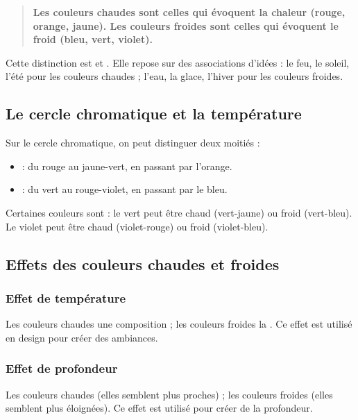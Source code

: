 \begin{quote}
\textbf{Les couleurs chaudes sont celles qui évoquent la chaleur (rouge, orange, jaune). Les couleurs froides sont celles qui évoquent le froid (bleu, vert, violet).}
\end{quote}

Cette distinction est  et . Elle repose sur des associations d'idées : le feu, le soleil, l'été pour les couleurs chaudes ; l'eau, la glace, l'hiver pour les couleurs froides.

\subsection{Le cercle chromatique et la température}

Sur le cercle chromatique, on peut distinguer deux moitiés :

\begin{itemize}
    \item {} : du rouge au jaune-vert, en passant par l'orange.
    \item {} : du vert au rouge-violet, en passant par le bleu.
\end{itemize}

Certaines couleurs sont  : le vert peut être chaud (vert-jaune) ou froid (vert-bleu). Le violet peut être chaud (violet-rouge) ou froid (violet-bleu).

\subsection{Effets des couleurs chaudes et froides}

\subsubsection{Effet de température}

Les couleurs chaudes  une composition ; les couleurs froides la . Ce effet est utilisé en design pour créer des ambiances.

\subsubsection{Effet de profondeur}

Les couleurs chaudes  (elles semblent plus proches) ; les couleurs froides  (elles semblent plus éloignées). Ce effet est utilisé pour créer de la profondeur.

